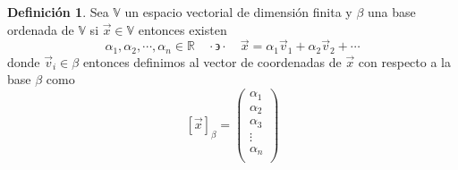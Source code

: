 \documentclass[letterpaper]{article}
\newcommand{\V}{\mathds{V}}
\newcommand{\tq}{ \quad \cdot  \backepsilon \cdot \quad }
\newcommand{\R}{\mathds{R}}
\renewcommand{\*}{\cdot}
\theoremstyle{definition}
\newtheorem{definition}{Definición}
\begin{document}
	\begin{definition}
		Sea $ \V $ un espacio vectorial de dimensión finita y $ \beta $ una base ordenada de $ \V $ si $ \vec{x} \in \V$ entonces existen $$ \alpha_1, \alpha_2, \cdots, \alpha_n \in \R \tq \vec{x} = \alpha_1 \vec{v}_1 + \alpha_2 \vec{v}_2 + \cdots $$ donde $ \vec{v}_i \in \beta $ entonces definimos al vector de coordenadas de $ \vec{x} $ con respecto a la base $ \beta $ como \[ [\vec{x}]_\beta = \begin{pmatrix}
		\alpha_1\\
		\alpha_2\\
		\alpha_3\\
		\vdots\\
		\alpha_n\\
		\end{pmatrix} \]
	\end{definition}
	
\end{document}
